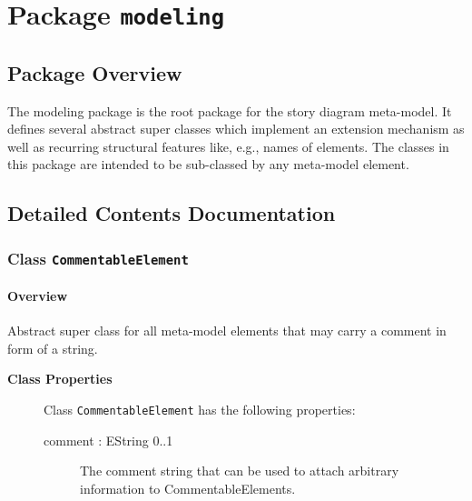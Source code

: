 \section{Package \bfseries \texttt{modeling}\normalfont}
\subsection{Package Overview}
	
			
The modeling package is the root package for the story diagram meta-model. It defines several abstract super classes which implement an extension mechanism as well as recurring structural features like, e.g., names of elements. The classes in this package are intended to be sub-classed by any meta-model element.	
		
	
			
		



\subsection{Detailed Contents Documentation}
\subsubsection{\Large{Class \bfseries \texttt{CommentableElement}\normalfont}}
\label{cls:modeling::CommentableElement} 
\paragraph{Overview}

	
			
Abstract super class for all meta-model elements that may carry a comment in form of a string.	
		
	


\begin{description}

	\item[\textbf{Class Properties}] Class \texttt{CommentableElement} has the following properties:
	\begin{description}
\item[comment : EString 			0..1]

\hspace{\fill}
\nopagebreak


	
			
The comment string that can be used to attach arbitrary information to CommentableElements.	
		
	
	\end{description}
	
	

\end{description}

